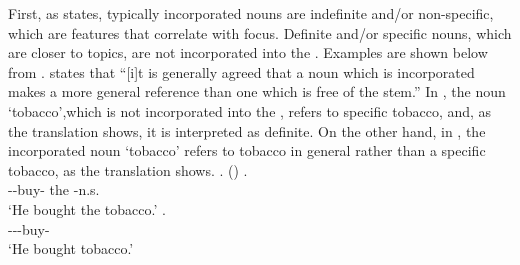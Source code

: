 First,
as  states,
typically incorporated nouns are {indefinite} and{\slash}or {non-specific},
which are features that correlate with focus.
Definite and/or specific nouns, which are closer to topics,
are not incorporated into the .
Examples are shown below from .
 states that
``[i]t is generally agreed that a noun which is incorporated makes a more general reference than one which is free of the  stem.''
In \Next[a], the noun `tobacco',which is not incorporated into the ,
refers to specific tobacco, and, as the translation shows,
it is interpreted as definite.
On the other hand, in \Next[b],
the incorporated noun `tobacco' refers to tobacco in general rather than a specific tobacco, as the translation shows.
%
\ex.  ()
 \ag.    \\
       --buy- the -n.s. \\
       `He bought the tobacco.'
 \bg.  \\
      ---buy- \\
      `He bought tobacco.'
      \hfill{\cite[10]{woodbury75a}}

